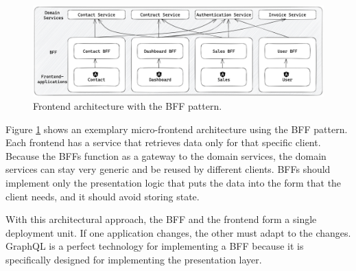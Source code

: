 \ifshowImages
\begin{figure}[H]
    \centering
    \includegraphics[width=1\linewidth]{images/background/micro-frontends/bff-architecture.jpg}
    \caption{Frontend architecture with the \ac{BFF} pattern.}\label{fig:background:micro-frontend:bff-architecture}
\end{figure}
\fi

\noindent Figure \ref{fig:background:micro-frontend:bff-architecture} shows an exemplary micro-frontend architecture using the \ac{BFF} pattern. Each frontend has a service that retrieves data only for that specific client. Because the \acp{BFF} function as a gateway to the domain services, the domain services can stay very generic and be reused by different clients. \acp{BFF} should implement only the presentation logic that puts the data into the form that the client needs, and it should avoid storing state. \cite{misc:2019:leitner:background:micro-frontends:backend-for-frontends}

\bigskip

\noindent With this architectural approach, the \ac{BFF} and the frontend form a single deployment unit. If one application changes, the other must adapt to the changes. GraphQL is a perfect technology for implementing a \ac{BFF} because it is specifically designed for implementing the presentation layer.
